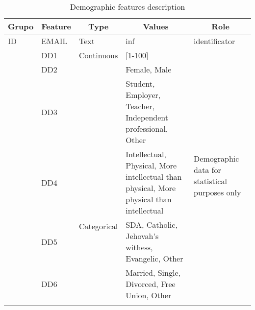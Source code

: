 \documentclass[10pt,letterpaper]{article}
\begin{document}
\begin{table}[ht]
	\centering
	\caption{Demographic features description}
	\label{tab:demographic-feature-description}
	\begin{tabular}{|l|l|l|p{5cm}|p{4cm}|}
		\hline
		\multicolumn{1}{|c|}{\textbf{Grupo}} & \multicolumn{1}{c|}{\textbf{Feature}} & \multicolumn{1}{c|}{\textbf{Type}} & \multicolumn{1}{c|}{\textbf{Values}}                                                     & \multicolumn{1}{c|}{\textbf{Role}}                              \\ \hline
		ID                                   & EMAIL                                 & Text                               & inf                                                                                      & identificator                                                   \\ \hline
		\multirow{8}{*}{}         & DD1                                   & Continuous                         & {[}1-100{]}                                                                              & \multirow{6}{4cm}{Demographic data for statistical purposes only} \\ \cline{2-4}
		& DD2                                   &        & Female, Male                                                                             &                                                                 \\ \cline{2-2} \cline{4-4} 
		& DD3                                   &                                    & Student, Employer, Teacher, Independent professional, Other                              &                                                                 \\ \cline{2-2} \cline{4-4}
		& DD4                                   & \multirow{6}{*}{Categorical}                                  & Intellectual, Physical, More intellectual than physical, More physical than intellectual &                                                                 \\ \cline{2-2} \cline{4-4} {Demographic}
		& DD5                                   &                                    & SDA, Catholic, Jehovah's withess, Evangelic, Other                                       &                                       \\ \cline{2-2} \cline{4-4} 
		& DD6                                   &                                    & Married, Single, Divorced, Free Union, Other                                             &                                                                 \\ \cline{2-2} \cline{4-5} 

\end{tabular}
\end{table}
\end{document}
